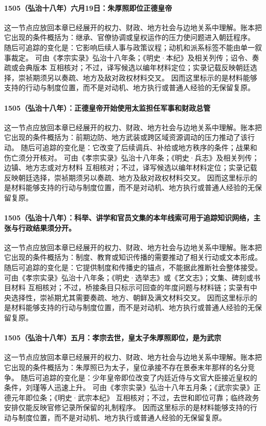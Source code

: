 \paragraph{1505（弘治十八年）六月19日：朱厚照即位正德皇帝} 这一节点应放回本章已经展开的权力、财政、地方社会与边地关系中理解。账本把它出现的条件概括为：继承、官僚协调或皇权运作的压力使问题进入朝廷程序。 随后可追踪的变化是：它影响后续人事与政策议程；动机和派系标签不能由单一叙事裁定。 可由《孝宗实录》弘治十八年条；《明史·本纪》及相关列传；诏令、奏疏或会典版本 互相核对；不过，译写候选以编年材料定位；实录记载反映朝廷选择，崇祯期须另以奏疏、地方及敌对政权材料交叉。 因而这里标示的是材料能够支持的行动与制度位置，而不是对动机、地方执行或普通人经验的无保留复原。

\paragraph{1505（弘治十八年）：正德皇帝开始使用太监担任军事和财政总管} 这一节点应放回本章已经展开的权力、财政、地方社会与边地关系中理解。账本把它出现的条件概括为：前期边防、地方武装或跨区域资源调动的压力推动了该行动。 随后可追踪的变化是：它改变了后续调兵、补给或地方秩序的条件；战果和伤亡须分开核对。 可由《孝宗实录》弘治十八年条；《明史·兵志》及相关列传；边镇、地方志或对方材料 互相核对；不过，译写候选以编年材料定位；实录记载反映朝廷选择，崇祯期须另以奏疏、地方及敌对政权材料交叉。 因而这里标示的是材料能够支持的行动与制度位置，而不是对动机、地方执行或普通人经验的无保留复原。

\paragraph{1505（弘治十八年）：科举、讲学和官员文集的本年线索可用于追踪知识网络，主张与行政结果须分开。} 这一节点应放回本章已经展开的权力、财政、地方社会与边地关系中理解。账本把它出现的条件概括为：制度、教育或知识传播的需要推动了相关行动或文本形成。 随后可追踪的变化是：它提供制度和传播史的锚点，不能据此推断社会整体接受。 可由《孝宗实录》弘治十八年条；《明史·选举志》或《艺文志》；文集、碑刻或书目材料 互相核对；不过，桥接条目只标示可回查的年度问题与材料链；实录有中央选择性，崇祯期尤其需要奏疏、地方、朝鲜及满文材料交叉。 因而这里标示的是材料能够支持的行动与制度位置，而不是对动机、地方执行或普通人经验的无保留复原。

\paragraph{1505（弘治十八年）五月：孝宗去世，皇太子朱厚照即位，是为武宗} 这一节点应放回本章已经展开的权力、财政、地方社会与边地关系中理解。账本把它出现的条件概括为：朱厚照已为太子，皇位承接不存在景泰末年那样的名分竞争。 随后可追踪的变化是：少年皇帝即位改变了内廷近侍与文官大臣接近皇权的条件，刘瑾等人迅速上升。 可由《孝宗实录》弘治十八年五月条；《武宗实录》正德元年即位条；《明史·武宗本纪》 互相核对；不过，去世和即位可靠；临终政务安排仅能反映官修记录所保留的礼制程序。 因而这里标示的是材料能够支持的行动与制度位置，而不是对动机、地方执行或普通人经验的无保留复原。

